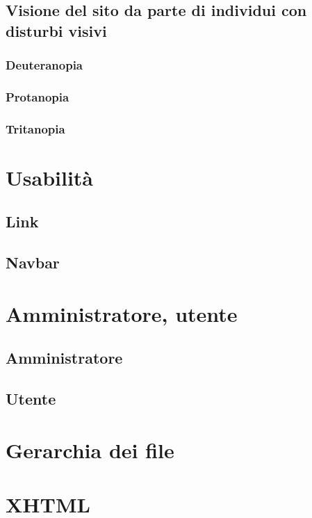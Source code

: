 \documentclass[10pt, a4paper]{article}
\begin{document}
\subsection{Visione del sito da parte di individui con disturbi visivi}

\subsubsection{Deuteranopia}

\subsubsection{Protanopia}

\subsubsection{Tritanopia}

\section{Usabilità}

\subsection{Link}

\subsection{Navbar}

\section{Amministratore, utente}

\subsection{Amministratore}

\subsection{Utente}

\section{Gerarchia dei file}

\section{XHTML}
\end{document}
